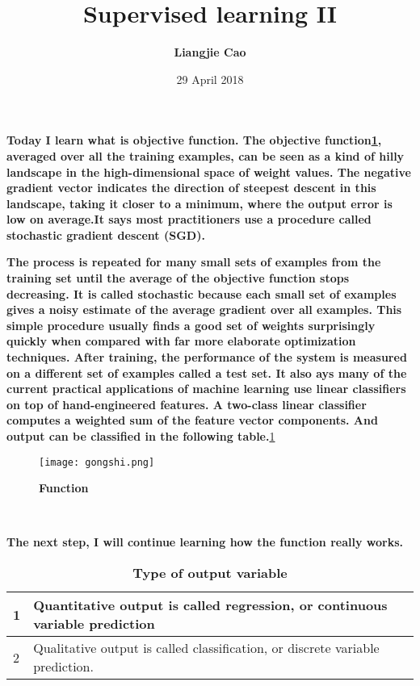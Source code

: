 \documentclass[12pt]{article}
\begin{document}
\title{\textbf{Supervised learning II}}
\author{\textbf{Liangjie Cao}}
\date{29 April 2018}
\maketitle
\par
\textbf{Today I learn what is objective function. The objective function\ref{Figure}, averaged over all the training examples, can be seen as a kind of hilly landscape in the high-dimensional space of weight values. The negative gradient vector indicates the direction of steepest descent in this landscape, taking it closer to a minimum, where the output error is low on average.\cite{name1}It says most practitioners use a procedure called stochastic gradient descent (SGD). }\\
\par
\textbf{The process is repeated for many small sets of examples from the training set until the average of the objective function stops decreasing. It is called stochastic because each small set of examples gives a noisy estimate of the average gradient over all examples. This simple procedure usually finds a good set of weights surprisingly quickly when compared with far more elaborate optimization techniques.\cite{name2} After training, the performance of the system is measured on a different set of examples called a test set. It also ays many of the current practical applications of machine learning use linear classifiers on top of hand-engineered features. A two-class linear classifier computes a weighted sum of the feature vector components. And output can be classified in the following table.}\ref{Table}
 \begin{figure}[ht]
 \centering
 \texttt{[image: gongshi.png]}\\
 \caption{\textbf{Function}}\label{Figure}
\end{figure}\\
\par
\textbf{The next step, I will continue learning how the function really works. }\\
 \begin{table}[!htbp]
  \centering
 \begin{tabular}{|p{1cm}|p{2cm}|p{3cm}}
   \hline
     1 & \tiny Quantitative output is called regression, or continuous variable prediction\\
  \hline
     2 &  \tiny Qualitative output is called classification, or discrete variable prediction.\\
   \hline
  \end{tabular}
  \caption{\textbf{Type of output variable}} \label{Table}
  \end{table}
\newpage
\newpage


\end{document}
